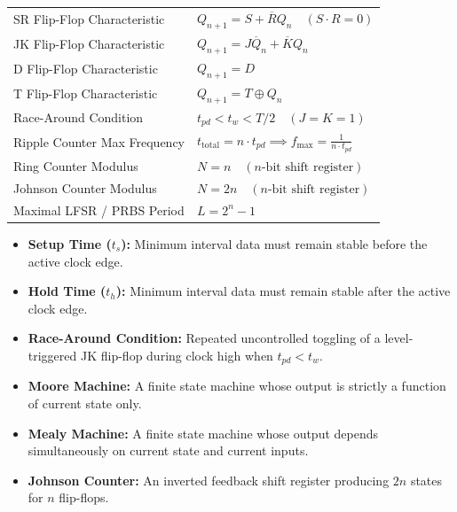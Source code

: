 \documentclass[12pt,a4paper]{article}
\renewcommand{\arraystretch}{1.45}
\begin{document}
\begin{tcolorbox}[formulabox, title={\textbf{Key Sequential Formulas and Equations at a Glance}}]
\renewcommand{\arraystretch}{1.35}
\begin{tabularx}{\linewidth}{B{5.2cm} X}
SR Flip-Flop Characteristic & $Q_{n+1} = S + \overline{R} Q_n \quad (S \cdot R = 0)$ \\[4pt]
JK Flip-Flop Characteristic & $Q_{n+1} = J \overline{Q}_n + \overline{K} Q_n$ \\[4pt]
D Flip-Flop Characteristic & $Q_{n+1} = D$ \\[4pt]
T Flip-Flop Characteristic & $Q_{n+1} = T \oplus Q_n$ \\[4pt]
Race-Around Condition & $t_{pd} < t_w < T/2 \quad (J=K=1)$ \\[4pt]
Ripple Counter Max Frequency & $t_{\text{total}} = n \cdot t_{pd} \implies f_{\max} = \frac{1}{n \cdot t_{pd}}$ \\[4pt]
Ring Counter Modulus & $N = n \quad (n\text{-bit shift register})$ \\[4pt]
Johnson Counter Modulus & $N = 2n \quad (n\text{-bit shift register})$ \\[4pt]
Maximal LFSR / PRBS Period & $L = 2^n - 1$ \\[4pt]
\end{tabularx}
\end{tcolorbox}

\begin{tcolorbox}[defbox, title={\textbf{One-Line Definitions}}]
\begin{itemize}[leftmargin=*, itemsep=2pt, topsep=0pt]
  \item \textbf{Setup Time ($t_s$):} Minimum interval data must remain stable before the active clock edge.
  \item \textbf{Hold Time ($t_h$):} Minimum interval data must remain stable after the active clock edge.
  \item \textbf{Race-Around Condition:} Repeated uncontrolled toggling of a level-triggered JK flip-flop during clock high when $t_{pd} < t_w$.
  \item \textbf{Moore Machine:} A finite state machine whose output is strictly a function of current state only.
  \item \textbf{Mealy Machine:} A finite state machine whose output depends simultaneously on current state and current inputs.
  \item \textbf{Johnson Counter:} An inverted feedback shift register producing $2n$ states for $n$ flip-flops.
\end{itemize}
\end{tcolorbox}
\end{document}
